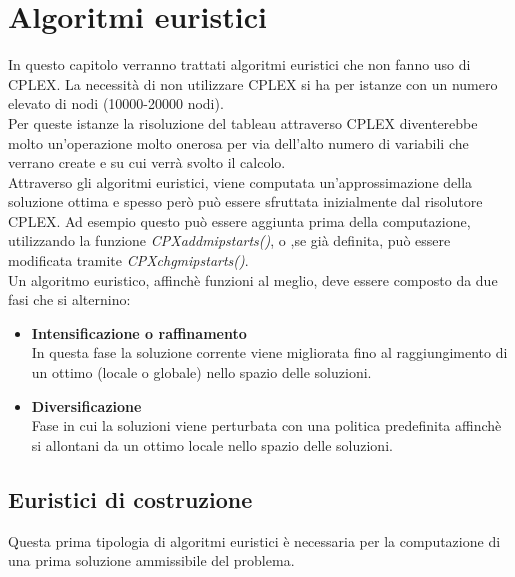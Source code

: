 \chapter{Algoritmi euristici}\label{HEURISTIC}
In questo capitolo verranno trattati algoritmi euristici che non fanno uso di CPLEX. La necessità di non utilizzare CPLEX si ha per istanze con un numero elevato di nodi (10000-20000 nodi).\\
Per queste istanze la risoluzione del tableau attraverso CPLEX diventerebbe molto un'operazione molto onerosa per via dell'alto numero di variabili che verrano create e su cui verrà svolto il calcolo.\\
Attraverso gli algoritmi euristici, viene computata un'approssimazione della soluzione ottima e spesso però può essere sfruttata inizialmente dal risolutore CPLEX. Ad esempio questo può essere aggiunta prima della computazione, utilizzando la funzione \textit{CPXaddmipstarts()}, o ,se già definita, può essere modificata tramite \textit{CPXchgmipstarts()}.\\
Un algoritmo euristico, affinchè funzioni al meglio, deve essere composto da due fasi che si alternino:
\begin{itemize}
\item{\textbf{Intensificazione o raffinamento}\\
In questa fase la soluzione corrente viene migliorata fino al raggiungimento di un ottimo (locale o globale) nello spazio delle soluzioni.
}
\item{\textbf{Diversificazione}\\
Fase in cui la soluzioni viene perturbata con una politica predefinita affinchè si allontani da un ottimo locale nello spazio delle soluzioni.
}
\end{itemize}


\section{Euristici di costruzione}
Questa prima tipologia di algoritmi euristici è necessaria per la computazione di una prima soluzione ammissibile del problema.
